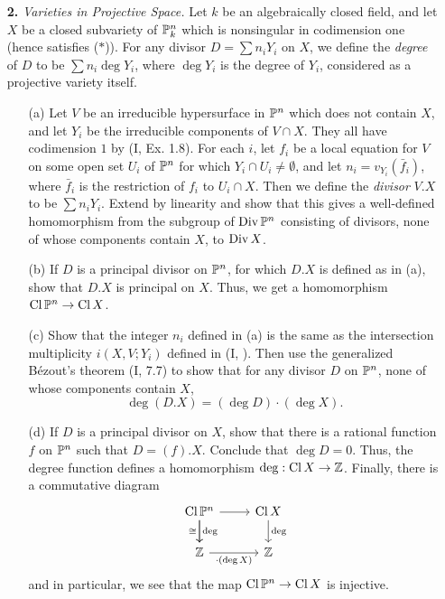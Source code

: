 \documentclass{article}
\begin{document}
\begin{enumerate} [label=\textbf{\arabic*.}, leftmargin=0em]
\item[\textbf{2.}] \textit{Varieties in Projective Space.} Let $k$ be an algebraically closed field, and let $X$ be a closed subvariety of $\mathbb{P}_k^n$ which is nonsingular in codimension one (hence satisfies ($*$)). For any divisor $D = \sum n_i Y_i$ on $X$, we define the \textit{degree} of $D$ to be $\sum n_i \deg Y_i$, where $\deg Y_i$ is the degree of $Y_i$, considered as a projective variety itself.
\begin{itemize}
    \item[(a)] Let $V$ be an irreducible hypersurface in $\mathbb{P}^n$ which does not contain $X$, and let $Y_i$ be the irreducible components of $V \cap X$. They all have codimension $1$ by (I, Ex. 1.8). For each $i$, let $f_i$ be a local equation for $V$ on some open set $U_i$ of $\mathbb{P}^n$ for which $Y_i \cap U_i \neq \emptyset$, and let $n_i = v_{Y_i}(\bar{f}_i)$, where $\bar{f}_i$ is the restriction of $f_i$ to $U_i \cap X$. Then we define the \textit{divisor} $V.X$ to be $\sum n_i Y_i$. Extend by linearity and show that this gives a well-defined homomorphism from the subgroup of $\operatorname{Div} \mathbb{P}^n$ consisting of divisors, none of whose components contain $X$, to $\operatorname{Div} X$.
    \item[(b)] If $D$ is a principal divisor on $\mathbb{P}^n$, for which $D.X$ is defined as in (a), show that $D.X$ is principal on $X$. Thus, we get a homomorphism $\operatorname{Cl}\mathbb{P}^n \to \operatorname{Cl} X$.
    \item[(c)] Show that the integer $n_i$ defined in (a) is the same as the intersection multiplicity $i(X, V; Y_i)$ defined in (I, ). Then use the generalized Bézout's theorem (I, 7.7) to show that for any divisor $D$ on $\mathbb{P}^n$, none of whose components contain $X$,
    \begin{equation*}
        \deg(D.X) = (\deg D) \cdot (\deg X).
    \end{equation*}
    \item[(d)] If $D$ is a principal divisor on $X$, show that there is a rational function $f$ on $\mathbb{P}^n$ such that $D = (f).X$. Conclude that $\deg D = 0$. Thus, the degree function defines a homomorphism $\deg : \operatorname{Cl} X \to \mathbb{Z}$. Finally, there is a commutative diagram
    \[\begin{tikzcd}
        \cl \PP^n \arrow[r] \arrow[d, "\cong"'] \arrow[d, "\deg "] & \cl X \arrow[d, "\deg"] \\
        \Z \arrow[r, "\cdot(\deg X)"']                                  & \Z                                 
        \end{tikzcd} \]
    and in particular, we see that the map $\operatorname{Cl} \mathbb{P}^n \to \operatorname{Cl} X$ is injective.
\end{itemize}


\end{enumerate}
\end{document}
